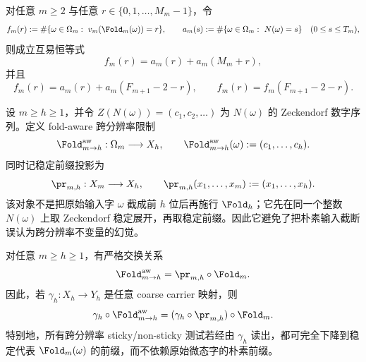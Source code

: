 \begin{proposition}[纤维计数的互易律与反射对称性]\label{prop:fold-fiber-count-reciprocity}
对任意 $m\ge 2$ 与任意 $r\in\{0,1,\dots,M_m-1\}$，令
\[
f_m(r):=\#\{\omega\in\Omega_m:\ v_m(\Fold_m(\omega))=r\},
\qquad
a_m(s):=\#\{\omega\in\Omega_m:\ N(\omega)=s\}\quad(0\le s\le T_m),
\]
则成立互易恒等式
\[
f_m(r)=a_m(r)+a_m(M_m+r),
\]
并且
\[
f_m(r)=a_m(r)+a_m(F_{m+1}-2-r),
\qquad
f_m(r)=f_m(F_{m+1}-2-r).
\]
\end{proposition}

\begin{definition}\label{distill:wang_zahl-sticky_reduction_and_scale_saturated_closure-fold-aware-cross-resolution}
设 \(m\ge h\ge 1\)，并令 \(Z(N(\omega))=(c_1,c_2,\ldots)\) 为 \(N(\omega)\) 的 Zeckendorf 数字序列。定义 fold-aware 跨分辨率限制
\[
\Fold^{\rm aw}_{m\to h}:\Omega_m\longrightarrow X_h,
\qquad
\Fold^{\rm aw}_{m\to h}(\omega):=(c_1,\ldots,c_h).
\]
同时记稳定前缀投影为
\[
\pr_{m,h}:X_m\longrightarrow X_h,
\qquad
\pr_{m,h}(x_1,\ldots,x_m):=(x_1,\ldots,x_h).
\]
该对象不是把原始输入字 \(\omega\) 截成前 \(h\) 位后再施行 \(\Fold_h\)；它先在同一个整数 \(N(\omega)\) 上取 Zeckendorf 稳定展开，再取稳定前缀。因此它避免了把朴素输入截断误认为跨分辨率不变量的幻觉。
\end{definition}

\begin{proposition}\label{distill:wang_zahl-sticky_reduction_and_scale_saturated_closure-fold-aware-prefix-commutation}
对任意 \(m\ge h\ge 1\)，有严格交换关系
\[
\Fold^{\rm aw}_{m\to h}=\pr_{m,h}\circ\Fold_m.
\]
因此，若 \(\gamma_h:X_h\to Y_h\) 是任意 coarse carrier 映射，则
\[
\gamma_h\circ\Fold^{\rm aw}_{m\to h}
=
(\gamma_h\circ\pr_{m,h})\circ\Fold_m.
\]
特别地，所有跨分辨率 sticky/non-sticky 测试若经由 \(\gamma_h\) 读出，都可完全下降到稳定代表 \(\Fold_m(\omega)\) 的前缀，而不依赖原始微态字的朴素前缀。
\end{proposition}


